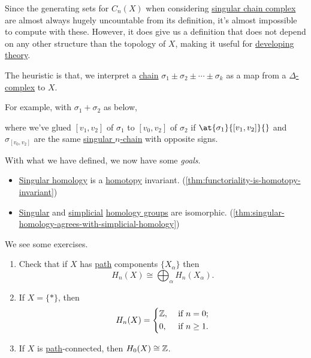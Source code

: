 \hr
Since the generating sets for \(C_{n} (X)\) when considering \hyperref[def:singular-chain-complex]{singular chain complex} are almost
always hugely uncountable from its definition, it's almost impossible to compute with these. However, it does give us a definition
that does not depend on any other structure than the topology of \(X\), making it useful for \underline{developing theory}.

\begin{note}
	The heuristic is that, we interpret a \hyperref[def:chain-complex]{chain} \(\sigma_1 \pm \sigma_2 \pm \cdots \pm \sigma_k\) as a
	map from a \hyperref[def:delta-complex]{\(\Delta\)-complex} to \(X\).

	\par For example, with \(\sigma_1 + \sigma_2\) as below,
	\begin{figure}[H]
		\centering
		\label{fig:note:chain-as-a-map}
	\end{figure}
	where we've glued \([v_1, v_2]\) of \(\sigma_1\) to \([v_0, v_2]\) of \(\sigma_2\) if \(\at{\sigma_1}{[v_1, v_2]}{}\) and
	\(\sigma_{[v_0, v_2]}\) are the same \hyperref[def:singular-chain]{singular \(n\)-chain} with opposite signs.
\end{note}

\hr

With what we have defined, we now have some \emph{goals}.
\begin{itemize}
	\item \hyperref[def:singular-homology-group]{Singular homology} is a \hyperref[def:homotopy]{homotopy} invariant. (\autoref{thm:functoriality-is-homotopy-invariant})
	\item \hyperref[def:singular-homology-group]{Singular} and \hyperref[def:simplicial-homology-group]{simplicial} \hyperref[def:homology-group]{homology groups} are isomorphic. (\autoref{thm:singular-homology-agrees-with-simplicial-homology})
\end{itemize}

\begin{exercise}
	We see some exercises.
	\begin{enumerate}
		\item Check that if \(X\) has \hyperref[def:path]{path} components \(\{X_\alpha\}\) then
		      \[
			      H_n(X) \cong \bigoplus_\alpha H_n(X_\alpha).
		      \]
		\item If \(X = \{\ast\}\), then
		      \[
			      H_n(X) = \begin{dcases}
				      \mathbb{\MakeUppercase{z}}, & \text{ if } n=0 ;     \\
				      0,                          & \text{ if } n\geq 1 .
			      \end{dcases}
		      \]
		\item If \(X\) is \hyperref[def:path]{path}-connected, then \(H_0(X) \cong \mathbb{\MakeUppercase{z}}\).
	\end{enumerate}

\end{exercise}

